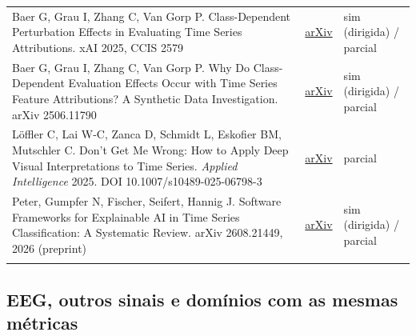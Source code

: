 \documentclass[11pt,a4paper]{article}
\begin{document}
{\begin{xltabular}{\linewidth}{>{\raggedright\arraybackslash}X>{\raggedright\arraybackslash}X>{\raggedright\arraybackslash}X}
Baer G, Grau I, Zhang C, Van Gorp P. Class-Dependent Perturbation Effects in Evaluating Time Series Attributions. xAI 2025, CCIS 2579 & \href{https://arxiv.org/abs/2502.17022}{arXiv} & sim (dirigida) / parcial \\ \addlinespace[1pt]
Baer G, Grau I, Zhang C, Van Gorp P. Why Do Class-Dependent Evaluation Effects Occur with Time Series Feature Attributions? A Synthetic Data Investigation. arXiv 2506.11790 & \href{https://arxiv.org/abs/2506.11790}{arXiv} & sim (dirigida) / parcial \\ \addlinespace[1pt]
Löffler C, Lai W-C, Zanca D, Schmidt L, Eskofier BM, Mutschler C. Don't Get Me Wrong: How to Apply Deep Visual Interpretations to Time Series. \textit{Applied Intelligence} 2025. DOI 10.1007/s10489-025-06798-3 & \href{https://arxiv.org/abs/2203.07861}{arXiv} & parcial \\ \addlinespace[1pt]
Peter, Gumpfer N, Fischer, Seifert, Hannig J. Software Frameworks for Explainable AI in Time Series Classification: A Systematic Review. arXiv 2608.21449, 2026 (preprint) & \href{https://arxiv.org/abs/2608.21449}{arXiv} & sim (dirigida) / parcial \\ \addlinespace[1pt]
\bottomrule
\end{xltabular}}


\subsection{EEG, outros sinais e domínios com as mesmas métricas}
\end{document}
